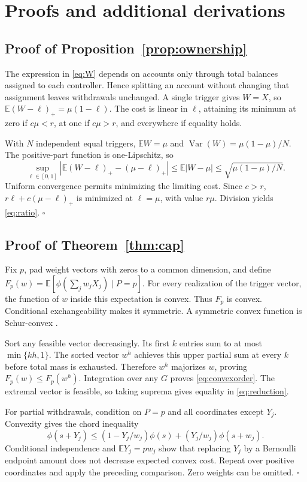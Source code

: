\documentclass[11pt]{article}
\theoremstyle{definition}\newtheorem{definition}[theorem]{Definition}
\newcommand{\E}{\mathbb E}
\newcommand{\pos}[1]{\left(#1\right)_+}
\begin{document}
\FloatBarrier


\clearpage
\appendix
\section{Proofs and additional derivations}
\subsection{Proof of Proposition~\ref{prop:ownership}}
The expression in \eqref{eq:W} depends on accounts only through total balances assigned to each controller. Hence splitting an account without changing that assignment leaves withdrawals unchanged. A single trigger gives \(W=X\), so \(\E\pos{W-\ell}=\mu(1-\ell)\). The cost is linear in \(\ell\), attaining its minimum at zero if \(c\mu<r\), at one if \(c\mu>r\), and everywhere if equality holds.

With \(N\) independent equal triggers, \(\E W=\mu\) and \(\operatorname{Var}(W)=\mu(1-\mu)/N\). The positive-part function is one-Lipschitz, so
\[\sup_{\ell\in[0,1]}\left|\E\pos{W-\ell}-\pos{\mu-\ell}\right|
 \leq\E|W-\mu|\leq\sqrt{\mu(1-\mu)/N}.\]
Uniform convergence permits minimizing the limiting cost. Since \(c>r\), \(r\ell+c\pos{\mu-\ell}\) is minimized at \(\ell=\mu\), with value \(r\mu\). Division yields \eqref{eq:ratio}. \hfill\(\square\)

\subsection{Proof of Theorem~\ref{thm:cap}}
Fix \(p\), pad weight vectors with zeros to a common dimension, and define
\(F_p(w)=\E[\phi(\sum_jw_jX_j)\mid P=p]\).
For every realization of the trigger vector, the function of \(w\) inside this expectation is convex. Thus \(F_p\) is convex. Conditional exchangeability makes it symmetric. A symmetric convex function is Schur-convex \citep{marshall2011}.

Sort any feasible vector decreasingly. Its first \(k\) entries sum to at most \(\min\{kh,1\}\). The sorted vector \(w^h\) achieves this upper partial sum at every \(k\) before total mass is exhausted. Therefore \(w^h\) majorizes \(w\), proving \(F_p(w)\leq F_p(w^h)\). Integration over any \(G\) proves \eqref{eq:convexorder}. The extremal vector is feasible, so taking suprema gives equality in \eqref{eq:reduction}.

For partial withdrawals, condition on \(P=p\) and all coordinates except \(Y_j\). Convexity gives the chord inequality
\[\phi(s+Y_j)\leq(1-Y_j/w_j)\phi(s)+(Y_j/w_j)\phi(s+w_j).\]
Conditional independence and \(\E Y_j=pw_j\) show that replacing \(Y_j\) by a Bernoulli endpoint amount does not decrease expected convex cost. Repeat over positive coordinates and apply the preceding comparison. Zero weights can be omitted. \hfill\(\square\)
\end{document}
